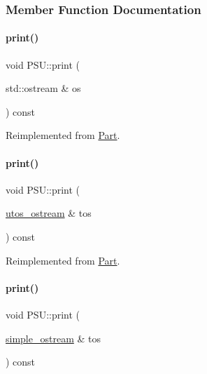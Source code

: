 \subsubsection{Member Function Documentation}
\mbox{\label{class_p_s_u_ad8f95676e09f5ba805dbba50759f44ba}} 
\paragraph{\texorpdfstring{print()}{print()}\hspace{0.1cm}{\footnotesize\ttfamily [1/4]}}
{\footnotesize\ttfamily void P\+S\+U\+::print (\begin{DoxyParamCaption}\item[{std\+::ostream \&}]{os }\end{DoxyParamCaption}) const\hspace{0.3cm}{\ttfamily [virtual]}}



Reimplemented from \mbox{\hyperlink{class_part_a4fa402b8e8fd4236ff773a7697ab2bc3}{Part}}.

\mbox{\label{class_p_s_u_a81c74aa3a327003c58b89ca2b8602c1d}} 
\paragraph{\texorpdfstring{print()}{print()}\hspace{0.1cm}{\footnotesize\ttfamily [2/4]}}
{\footnotesize\ttfamily void P\+S\+U\+::print (\begin{DoxyParamCaption}\item[{\mbox{\hyperlink{structutos__ostream}{utos\+\_\+ostream}} \&}]{tos }\end{DoxyParamCaption}) const\hspace{0.3cm}{\ttfamily [virtual]}}



Reimplemented from \mbox{\hyperlink{class_part_a9ecabe44ba3415badf82c6a23617a41e}{Part}}.

\mbox{\label{class_p_s_u_a57f14e0dee163f33d01cdbb159b6d9d6}} 
\paragraph{\texorpdfstring{print()}{print()}\hspace{0.1cm}{\footnotesize\ttfamily [3/4]}}
{\footnotesize\ttfamily void P\+S\+U\+::print (\begin{DoxyParamCaption}\item[{\mbox{\hyperlink{structsimple__ostream}{simple\+\_\+ostream}} \&}]{tos }\end{DoxyParamCaption}) const\hspace{0.3cm}{\ttfamily [virtual]}}



